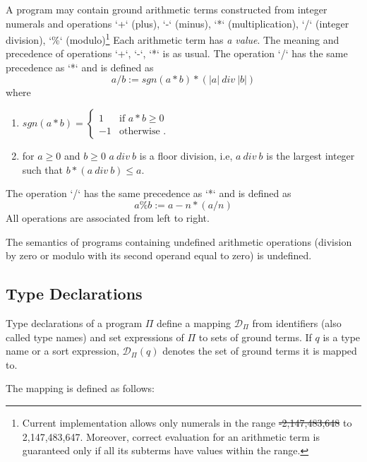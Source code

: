 \documentclass[a4paper,10pt]{article}
\providecommand{\DIFaddtex}[1]{{\protect\color{blue}\uwave{#1}}} %
\providecommand{\DIFdeltex}[1]{{\protect\color{red}\sout{#1}}}                      %
\providecommand{\DIFaddbegin}{} %
\providecommand{\DIFaddend}{} %
\providecommand{\DIFdelbegin}{} %
\providecommand{\DIFdelend}{} %
\providecommand{\DIFadd}[1]{\texorpdfstring{\DIFaddtex{#1}}{#1}} %
\providecommand{\DIFdel}[1]{\texorpdfstring{\DIFdeltex{#1}}{}} %
\begin{document}
A program may contain ground arithmetic terms constructed from integer numerals and operations `+` (plus),  `-` (minus), `*` (multiplication), `/` (integer division), `\%` (modulo)\footnote{Current implementation allows only numerals in the range \DIFdelbegin \DIFdel{-2,147,483,648 }\DIFdelend \DIFaddbegin \DIFadd{from 0 }\DIFaddend to 2,147,483,647. Moreover, correct evaluation for an arithmetic term is guaranteed only if all its subterms have values within the range.} Each arithmetic term  has \textit{a value}. 
The meaning and precedence of operations  `+`,  `-`, `*` is as usual. The  operation `/` has the same precedence as `*` and is defined as $$a/b := sgn(a*b) *(|a|~div~|b|)$$
where 
\begin{enumerate}
\item $sgn(a*b) = \begin{cases} 1 &\mbox{if } a *b \ge 0 \\
-1 & \mbox{otherwise }. \end{cases} $
\item for $a\ge 0$ and $b\ge0$ $a~div~b$ is a floor division, i.e, $a~div~b$ is the largest integer such that $b * (a~div~b)  \le  a$.
\end{enumerate}
The  operation `/` has the same precedence as `*` and is defined as $$a\%b := a - n * (a/n) $$
All operations are associated from left to right. 


\medskip\noindent
The semantics of programs containing undefined arithmetic operations (division by zero or modulo with its second operand equal to zero) is undefined.  

  


\subsection{Type Declarations} \label{types}
Type declarations of a program $\Pi$  define a mapping $\mathcal{D}_\Pi$ from identifiers (also called type names) and set expressions of $\Pi$  to sets of ground terms. If $q$ is a type name or a sort expression, $\mathcal{D}_\Pi(q)$  denotes the set of ground terms it is mapped to. 


\medskip\noindent 
The mapping is defined as follows:
\end{document}
